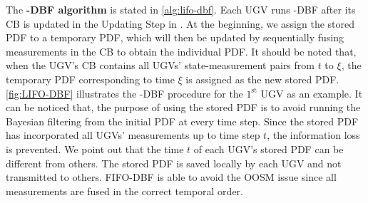 	The \textbf{\proto-DBF algorithm} is stated in \cref{alg:lifo-dbf}.
	Each UGV runs \proto-DBF after its CB is updated in the Updating Step in .
	At the beginning, we assign the stored PDF to a temporary PDF, which will then be updated by sequentially fusing measurements in the CB to obtain the individual PDF.
	It should be noted that, when the UGV's CB contains all UGVs' state-measurement pairs from $t$ to $\xi$, \textcolor{\revcol}{the temporary PDF corresponding to time $\xi$ is assigned as the new stored PDF.}
	\cref{fig:LIFO-DBF} illustrates the \proto-DBF procedure for the $1^\text{st}$ UGV as an example.
	It can be noticed that, the purpose of using the stored PDF is to avoid running the Bayesian filtering from the initial PDF at every time step. 
	Since the stored PDF has incorporated all UGVs' measurements up to time step $t$, the information loss is prevented. %
	We point out that the time $t$ of each UGV's stored PDF can be different from others.
	The stored PDF is saved locally by each UGV and not transmitted to others.
	\textcolor{\revcol}{FIFO-DBF is able to avoid the OOSM issue since all measurements are fused in the correct temporal order.}
		
